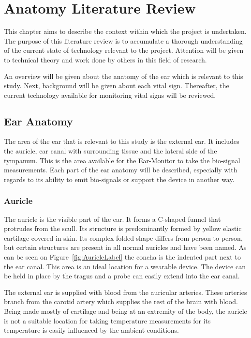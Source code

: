 \chapter{Anatomy Literature Review}
\label{chp:AnatomyLit}
This chapter aims to describe the context within which the project is undertaken. The purpose of this literature review is to accumulate a thorough understanding of the current state of technology relevant to the project. Attention will be given to technical theory and work done by others in this field of research.

\medskip

An overview will be given about the anatomy of the ear which is relevant to this study. Next, background will be given about each vital sign. Thereafter, the current technology available for monitoring vital signs will be reviewed.

\section{Ear Anatomy} %
The area of the ear that is relevant to this study is the external ear. It includes the auricle, ear canal with surrounding tissue and the lateral side of the tympanum. This is the area available for the Ear-Monitor to take the bio-signal measurements. Each part of the ear anatomy will be described, especially with regards to its ability to emit bio-signals or support the device in another way.

\subsection{Auricle}
The auricle is the visible part of the ear. It forms a C-shaped funnel that protrudes from the scull. Its structure is predominantly formed by yellow elastic cartilage covered in skin. Its complex folded shape differs from person to person, but certain structures are present in all normal auricles and have been named. As can be seen on Figure~\ref{fig:AuricleLabel} the concha is the indented part next to the ear canal. This area is an ideal location for a wearable device. The device can be held in place by the tragus and a probe can easily extend into the ear canal.

\medskip

The external ear is supplied with blood from the auricular arteries. These arteries branch from the carotid artery which supplies the rest of the brain with blood. Being made mostly of cartilage and being at an extremity of the body, the auricle is not a suitable location for taking temperature measurements for its temperature is easily influenced by the ambient conditions.

